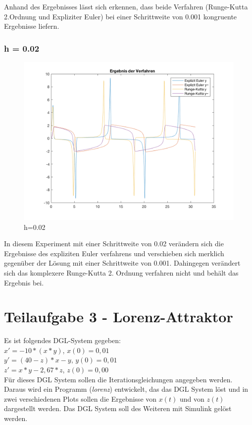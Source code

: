 \documentclass[]{scrartcl}
\begin{document}
Anhand des Ergebnisses lässt sich erkennen, dass beide Verfahren (Runge-Kutta 2.Ordnung und Expliziter Euler) bei einer Schrittweite von 0.001 kongruente Ergebnisse liefern.


\subsubsection{h = 0.02}
\begin{figure}[H]
	\centering
	\includegraphics[width=1\linewidth]{a1_2_2}
	\caption{h=0.02}
	\label{fig:a1_2_2}
\end{figure}

In diesem Experiment mit einer Schrittweite von 0.02 verändern sich die Ergebnisse des expliziten Euler verfahrens und verschieben sich merklich gegenüber der Lösung mit einer Schrittweite von 0.001. Dahingegen verändert sich das komplexere Runge-Kutta 2. Ordnung verfahren nicht und behält das Ergebnis bei.

\section{Teilaufgabe 3 - Lorenz-Attraktor}
Es ist folgendes DGL-System gegeben: \\
$x' = -10 * (x*y)$, $x(0) = 0,01$ \\
$y' = (40 - z) * x - y$, $y(0) = 0,01$ \\
$z' = x * y - 2,67 * z$, $z(0) = 0,00$\\

Für dieses DGL System sollen die Iterationsgleichungen angegeben werden. Daraus wird ein Programm (\textit{lorenz}) entwickelt, das das DGL System löst und in zwei verschiedenen Plots sollen die Ergebnisse von $x(t)$ und von $z(t)$ dargestellt werden.
Das DGL System soll des Weiteren mit Simulink gelöst werden.\\
\end{document}
